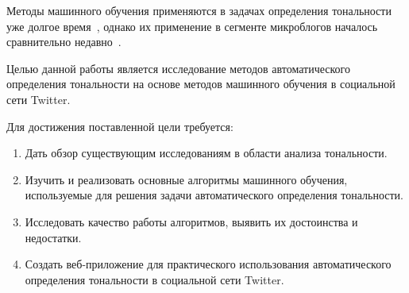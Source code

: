 Методы машинного обучения применяются в задачах определения тональности 
уже долгое время~\cite{panglee}, однако их применение в сегменте микроблогов 
началось сравнительно недавно~\cite{distsuperv}.

\vspace{0.5cm}

Целью данной работы является исследование методов автоматического 
определения тональности на основе методов машинного обучения в социальной 
сети Twitter. 

Для достижения поставленной цели требуется:

\begin{enumerate}

\item 
Дать обзор существующим исследованиям в области анализа тональности.

\item 
Изучить и реализовать основные алгоритмы машинного обучения, используемые 
для решения задачи автоматического определения тональности.

\item 
Исследовать качество работы алгоритмов, выявить их достоинства и недостатки.

\item 
Создать веб-приложение для практического использования автоматического 
определения тональности в социальной сети Twitter. 

\end{enumerate}